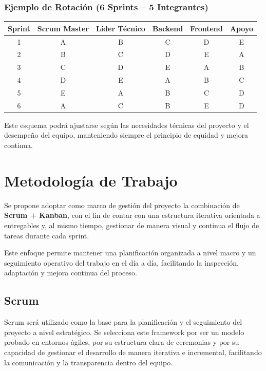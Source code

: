 \documentclass[12pt]{article}
\begin{document}
\subsubsection{Ejemplo de Rotación (6 Sprints – 5 Integrantes)}

\begin{center}
\begin{tabular}{|c|c|c|c|c|c|}
\hline
\textbf{Sprint} & \textbf{Scrum Master} & \textbf{Líder Técnico} & \textbf{Backend} & \textbf{Frontend} & \textbf{Apoyo} \\
\hline
1 & A & B & C & D & E \\
\hline
2 & B & C & D & E & A \\
\hline
3 & C & D & E & A & B \\
\hline
4 & D & E & A & B & C \\
\hline
5 & E & A & B & C & D \\
\hline
6 & A & C & B & E & D \\
\hline
\end{tabular}
\end{center}

Este esquema podrá ajustarse según las necesidades técnicas del proyecto y el desempeño del equipo, manteniendo siempre el principio de equidad y mejora continua.
\section{Metodología de Trabajo}

Se propone adoptar como marco de gestión del proyecto la combinación de \textbf{Scrum + Kanban}, con el fin de contar con una estructura iterativa orientada a entregables y, al mismo tiempo, gestionar de manera visual y continua el flujo de tareas durante cada sprint.

Este enfoque permite mantener una planificación organizada a nivel macro y un seguimiento operativo del trabajo en el día a día, facilitando la inspección, adaptación y mejora continua del proceso.

\subsection{Scrum}

Scrum será utilizado como la base para la planificación y el seguimiento del proyecto a nivel estratégico. Se selecciona este framework por ser un modelo probado en entornos ágiles, por su estructura clara de ceremonias y por su capacidad de gestionar el desarrollo de manera iterativa e incremental, facilitando la comunicación y la transparencia dentro del equipo.
\end{document}
